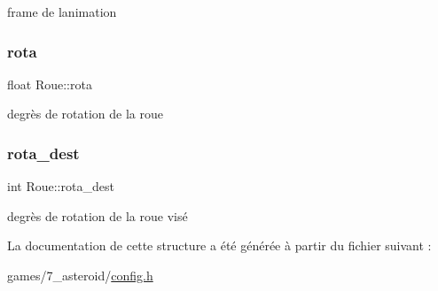 frame de l\textquotesingle{}animation 

\mbox{\label{struct_roue_a2d6c1ab5e9228e3422bfd830fce12ff9}} 
\subsubsection{\texorpdfstring{rota}{rota}}
{\footnotesize\ttfamily float Roue\+::rota}



degrès de rotation de la roue 

\mbox{\label{struct_roue_a69fdface0ca9109eb0d99c4ef83994a6}} 
\subsubsection{\texorpdfstring{rota\+\_\+dest}{rota\_dest}}
{\footnotesize\ttfamily int Roue\+::rota\+\_\+dest}



degrès de rotation de la roue visé 



La documentation de cette structure a été générée à partir du fichier suivant \+:\begin{DoxyCompactItemize}
\item 
games/7\+\_\+asteroid/\hyperlink{7__asteroid_2config_8h}{config.\+h}\end{DoxyCompactItemize}
